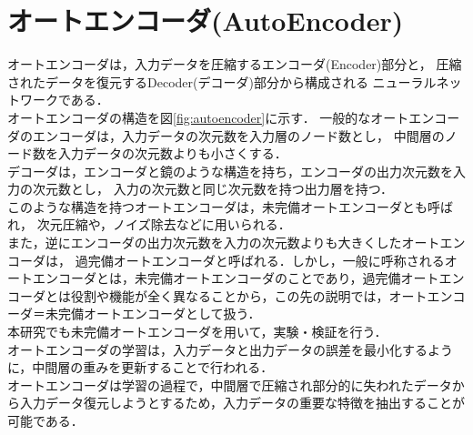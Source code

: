 \section{オートエンコーダ(AutoEncoder)}
オートエンコーダは，入力データを圧縮するエンコーダ(Encoder)部分と，
圧縮されたデータを復元するDecoder(デコーダ)部分から構成される
ニューラルネットワークである．\\
オートエンコーダの構造を図\ref{fig:autoencoder}に示す．
一般的なオートエンコーダのエンコーダは，入力データの次元数を入力層のノード数とし，
中間層のノード数を入力データの次元数よりも小さくする．\\
デコーダは，エンコーダと鏡のような構造を持ち，エンコーダの出力次元数を入力の次元数とし，
入力の次元数と同じ次元数を持つ出力層を持つ．\\
このような構造を持つオートエンコーダは，未完備オートエンコーダとも呼ばれ，
次元圧縮や，ノイズ除去などに用いられる．\\
また，逆にエンコーダの出力次元数を入力の次元数よりも大きくしたオートエンコーダは，
過完備オートエンコーダと呼ばれる．しかし，一般に呼称されるオートエンコーダとは，未完備オートエンコーダのことであり，過完備オートエンコーダとは役割や機能が全く異なることから，この先の説明では，オートエンコーダ＝未完備オートエンコーダとして扱う．\\
本研究でも未完備オートエンコーダを用いて，実験・検証を行う．\\

オートエンコーダの学習は，入力データと出力データの誤差を最小化するように，中間層の重みを更新することで行われる．\\

オートエンコーダは学習の過程で，中間層で圧縮され部分的に失われたデータから入力データ復元しようとするため，入力データの重要な特徴を抽出することが可能である．\\



\newpage